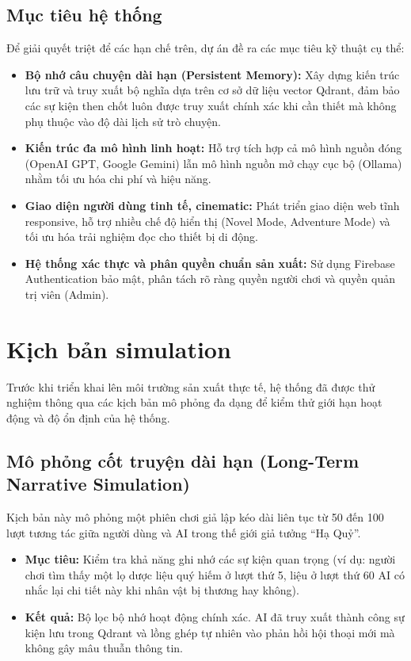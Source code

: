 \documentclass[a4paper]{article}
\begin{document}
\begin{titlepage}
\subsection{Mục tiêu hệ thống}
Để giải quyết triệt để các hạn chế trên, dự án đề ra các mục tiêu kỹ thuật cụ thể:
\begin{itemize}
    \item \textbf{Bộ nhớ câu chuyện dài hạn (Persistent Memory):} Xây dựng kiến trúc lưu trữ và truy xuất bộ nghĩa dựa trên cơ sở dữ liệu vector Qdrant, đảm bảo các sự kiện then chốt luôn được truy xuất chính xác khi cần thiết mà không phụ thuộc vào độ dài lịch sử trò chuyện.
    \item \textbf{Kiến trúc đa mô hình linh hoạt:} Hỗ trợ tích hợp cả mô hình nguồn đóng (OpenAI GPT, Google Gemini) lẫn mô hình nguồn mở chạy cục bộ (Ollama) nhằm tối ưu hóa chi phí và hiệu năng.
    \item \textbf{Giao diện người dùng tinh tế, cinematic:} Phát triển giao diện web tĩnh responsive, hỗ trợ nhiều chế độ hiển thị (Novel Mode, Adventure Mode) và tối ưu hóa trải nghiệm đọc cho thiết bị di động.
    \item \textbf{Hệ thống xác thực và phân quyền chuẩn sản xuất:} Sử dụng Firebase Authentication bảo mật, phân tách rõ ràng quyền người chơi và quyền quản trị viên (Admin).
\end{itemize}

\section{Kịch bản simulation}

Trước khi triển khai lên môi trường sản xuất thực tế, hệ thống đã được thử nghiệm thông qua các kịch bản mô phỏng đa dạng để kiểm thử giới hạn hoạt động và độ ổn định của hệ thống.

\subsection{Mô phỏng cốt truyện dài hạn (Long-Term Narrative Simulation)}
Kịch bản này mô phỏng một phiên chơi giả lập kéo dài liên tục từ 50 đến 100 lượt tương tác giữa người dùng và AI trong thế giới giả tưởng ``Hạ Quỷ''.
\begin{itemize}
    \item \textbf{Mục tiêu:} Kiểm tra khả năng ghi nhớ các sự kiện quan trọng (ví dụ: người chơi tìm thấy một lọ dược liệu quý hiếm ở lượt thứ 5, liệu ở lượt thứ 60 AI có nhắc lại chi tiết này khi nhân vật bị thương hay không).
    \item \textbf{Kết quả:} Bộ lọc bộ nhớ hoạt động chính xác. AI đã truy xuất thành công sự kiện lưu trong Qdrant và lồng ghép tự nhiên vào phản hồi hội thoại mới mà không gây mâu thuẫn thông tin.
\end{itemize}


\end{titlepage}
\end{document}
